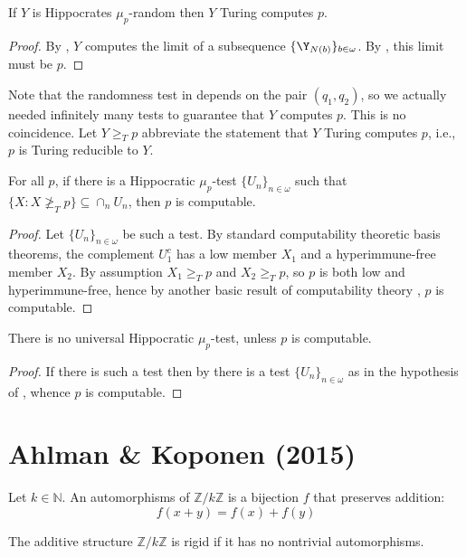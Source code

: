 \begin{corollary}\label{Hippo_compute}
If $Y$ is Hippocrates $\mu_p$-random then $Y$ Turing computes $p$.
\end{corollary}
\begin{proof}
By , $Y$ computes the limit of a subsequence $\{\Y_{N(b)}\}_{b\in\omega}$. By , this limit must be $p$.
\end{proof}

Note that the randomness test in  depends on the pair $(q_1,q_2)$, so we actually needed infinitely many tests to guarantee that $Y$ computes $p$. This is no coincidence. Let $Y\ge_T p$ abbreviate the statement that $Y$ Turing computes $p$, i.e., $p$ is Turing reducible to $Y$.
        
\begin{theorem}\label{not_compute_test}
For all $p$, if there is a Hippocratic $\mu_p$-test $\{U_n\}_{n\in\omega}$ such that $\{X:X\not\ge_T p\}\subseteq\cap_n U_n$, then $p$ is computable.
\end{theorem}
\begin{proof}
Let $\{U_n\}_{n\in\omega}$ be such a test. By standard computability theoretic basis theorems, the complement $U_1^c$ has a low member $X_1$ and a hyperimmune-free member $X_2$. By assumption $X_1\ge_T p$ and $X_2\ge_T p$, so $p$ is both low and hyperimmune-free, hence by another basic result of computability theory \cite{Soare}, $p$ is computable.
\end{proof}

\begin{corollary}\label{noUniv}
There is no universal Hippocratic $\mu_p$-test, unless $p$ is computable. 
\end{corollary}
\begin{proof}
If there is such a test then by  there is a test $\{U_n\}_{n\in\omega}$ as in the hypothesis of , whence $p$ is computable.
\end{proof}



\chapter{Ahlman \& Koponen (2015)}
\begin{definition}
	\label{def:auto}
	Let $k\in\mathbb N$.
	An automorphisms of $\mathbb Z/ k\mathbb Z$ is a bijection $f$ that preserves addition:
	\[
	f(x+y)=f(x)+f(y)
	\]
\end{definition}
\begin{definition}
	\label{def:rigid}
	\leanok
	The additive structure $\mathbb Z/ k\mathbb Z$ is rigid if it has no nontrivial automorphisms.
\end{definition}


